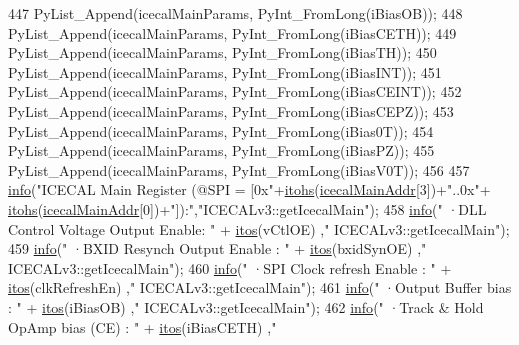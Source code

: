 \begin{DoxyCode}
447         PyList\_Append(icecalMainParams, PyInt\_FromLong(iBiasOB));
448         PyList\_Append(icecalMainParams, PyInt\_FromLong(iBiasCETH));
449         PyList\_Append(icecalMainParams, PyInt\_FromLong(iBiasTH));
450         PyList\_Append(icecalMainParams, PyInt\_FromLong(iBiasINT));
451         PyList\_Append(icecalMainParams, PyInt\_FromLong(iBiasCEINT));
452         PyList\_Append(icecalMainParams, PyInt\_FromLong(iBiasCEPZ));
453         PyList\_Append(icecalMainParams, PyInt\_FromLong(iBias0T));
454         PyList\_Append(icecalMainParams, PyInt\_FromLong(iBiasPZ));
455         PyList\_Append(icecalMainParams, PyInt\_FromLong(iBiasV0T));
456 
457         \hyperlink{classObject_a644fd329ea4cb85f54fa6846484b84a8}{info}(\textcolor{stringliteral}{"ICECAL Main Register (@SPI = [0x"}+\hyperlink{classICECALv3_a04b02e583f191bfce34d05132cd23834}{itohs}(\hyperlink{ICECALv3_8h_a9c22ae782814495416dc2b803df326c1}{icecalMainAddr}[3])+\textcolor{stringliteral}{"..0x"}+
      \hyperlink{classICECALv3_a04b02e583f191bfce34d05132cd23834}{itohs}(\hyperlink{ICECALv3_8h_a9c22ae782814495416dc2b803df326c1}{icecalMainAddr}[0])+\textcolor{stringliteral}{"]):"},\textcolor{stringliteral}{"ICECALv3::getIcecalMain"});
458         \hyperlink{classObject_a644fd329ea4cb85f54fa6846484b84a8}{info}(\textcolor{stringliteral}{"   ·DLL Control Voltage Output Enable: "} + \hyperlink{Tools_8h_af330027dbdafb9a30768b3613c553e60}{itos}(vCtlOE)               ,\textcolor{stringliteral}{"
      ICECALv3::getIcecalMain"});
459         \hyperlink{classObject_a644fd329ea4cb85f54fa6846484b84a8}{info}(\textcolor{stringliteral}{"   ·BXID Resynch Output Enable       : "} + \hyperlink{Tools_8h_af330027dbdafb9a30768b3613c553e60}{itos}(bxidSynOE)        ,\textcolor{stringliteral}{"
      ICECALv3::getIcecalMain"});
460         \hyperlink{classObject_a644fd329ea4cb85f54fa6846484b84a8}{info}(\textcolor{stringliteral}{"   ·SPI Clock refresh Enable         : "} + \hyperlink{Tools_8h_af330027dbdafb9a30768b3613c553e60}{itos}(clkRefreshEn) ,\textcolor{stringliteral}{"
      ICECALv3::getIcecalMain"});
461         \hyperlink{classObject_a644fd329ea4cb85f54fa6846484b84a8}{info}(\textcolor{stringliteral}{"   ·Output Buffer bias               : "} + \hyperlink{Tools_8h_af330027dbdafb9a30768b3613c553e60}{itos}(iBiasOB)          ,\textcolor{stringliteral}{"
      ICECALv3::getIcecalMain"});
462         \hyperlink{classObject_a644fd329ea4cb85f54fa6846484b84a8}{info}(\textcolor{stringliteral}{"   ·Track & Hold OpAmp bias (CE)     : "} + \hyperlink{Tools_8h_af330027dbdafb9a30768b3613c553e60}{itos}(iBiasCETH)        ,\textcolor{stringliteral}{"
}
\end{DoxyCode}
